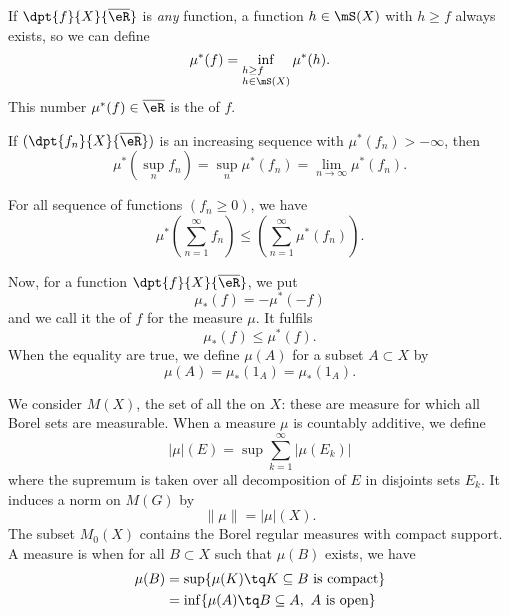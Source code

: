 If $\dpt{f}{X}{\overline{ \eR }}$ is \emph{any} function, a function $h\in\mS(X)$ with $h\geq f$ always exists, so we can define
\begin{equation}
	\mu^*(f)=\inf_{%
		\begin{subarray}{l}
			h\geq f\\
			h\in\mS(X)
		\end{subarray}
	} \mu^*(h).
\end{equation}
This number $\mu^*(f)\in\overline{ \eR }$ is the  of $f$.


\begin{proposition}
	If $(\dpt{f_n}{X}{\overline{ \eR }})$ is an increasing sequence with $\mu^*(f_n)>-\infty$, then
	\[
		\mu^*(\sup_nf_n)=\sup_n\mu^*(f_n)=\lim_{n\to\infty}\mu^*(f_n).
	\]

\end{proposition}

\begin{proposition}
	For all sequence of functions $(f_n\geq 0)$, we have
	\[
		\mu^*\left( \sum_{n=1}^{\infty}f_n\right)\leq\left(\sum_{n=1}^{\infty}\mu^*(f_n) \right).
	\]

\end{proposition}

Now, for a function $\dpt{f}{X}{\overline{ \eR }}$, we put
\begin{equation}
	\mu_*(f)=-\mu^*(-f)
\end{equation}
and we call it the  of $f$ for the measure $\mu$. It fulfils
\[
	\mu_*(f)\leq\mu^*(f).
\]
When the equality are true, we define $\mu(A)$ for a subset $A\subset X$ by
\begin{equation}
	\mu(A)=\mu_*(1_A)=\mu_*(1_A).
\end{equation}

We consider $M(X)$\label{defMX}, the set of all the  on $X$: these are measure for which all Borel sets are measurable. When a measure $\mu$ is countably additive, we define
\begin{equation}
	| \mu |(E)=\sup \sum_{k=1}^{\infty}| \mu(E_k) |
\end{equation}
where the supremum is taken over all decomposition of $E$ in disjoints sets $E_k$. It induces a norm on $M(G)$ by
\[
	\| \mu \|=| \mu |(X).
\]
The subset  $M_0(X)$\label{defMzX} contains the Borel regular measures with compact support. A measure is  when for all $B\subset X$ such that $\mu(B)$ exists, we have
\begin{equation}
	\begin{split}
		\mu(B)&=\sup\{ \mu(K)\tq K\subseteq B \textrm{ is compact} \}\\
		&=\inf\{ \mu(A)\tq B\subseteq A, \textrm{ $A$ is open} \}
	\end{split}
\end{equation}

